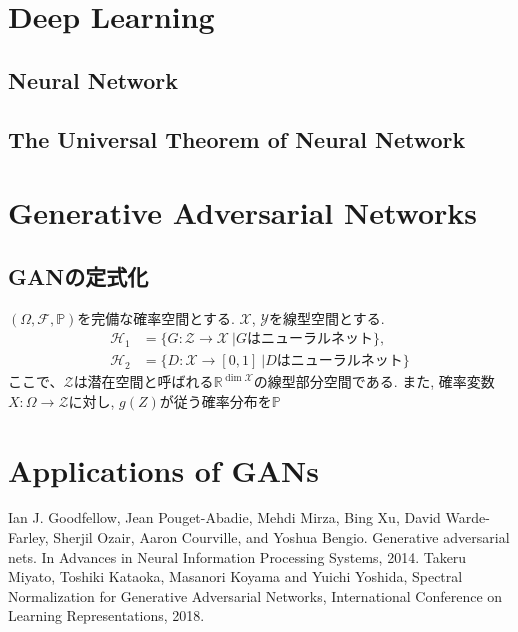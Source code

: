 \documentclass[11pt, a4paper, dvipdfmx]{jsarticle}
\theoremstyle{definition}
\newcommand{\R}{\mathbb{R}}
\newcommand{\F}{\mathcal{F}}
\newcommand{\X}{\mathcal{X}}
\newcommand{\Y}{\mathcal{Y}}
\newcommand{\Hil}{\mathcal{H}}
\renewcommand{\P}{\mathbb{P}}
\newcommand{\Probsp}{(\Omega, \F, \P)}
\begin{document}
\section{Deep Learning}
\subsection{Neural Network}
\subsection{The Universal Theorem of Neural Network}
\section{Generative Adversarial Networks}
\subsection{GANの定式化}
$\Probsp$を完備な確率空間とする.  
$\X$, $\Y$を線型空間とする. 
\begin{align*}
    \Hil_1 &= \{G:\mathcal{Z}\to\X~| G\text{はニューラルネット}\},\\
    \Hil_{2} &= \{D:\X\to [0, 1]~| D\text{はニューラルネット}\}
\end{align*}
ここで、$\mathcal{Z}$は潜在空間と呼ばれる$\R^{\dim\X}$の線型部分空間である.
また, 確率変数$X:\Omega\to\mathcal{Z}$に対し, $g(Z)$が従う確率分布を$\mathbb{P}_{}$
\section{Applications of GANs}

\begin{thebibliography}{20}
     Ian J. Goodfellow, Jean Pouget-Abadie, Mehdi Mirza, Bing Xu, David Warde- Farley, Sherjil Ozair, Aaron Courville, and Yoshua Bengio. 
    Generative adversarial nets. In Advances in Neural Information Processing Systems, 2014.
    Takeru Miyato, Toshiki Kataoka, Masanori Koyama and Yuichi Yoshida, Spectral Normalization for Generative Adversarial Networks, 
    International Conference on Learning Representations, 2018.
\end{thebibliography}
\end{document}
